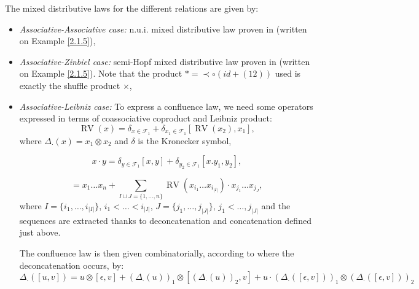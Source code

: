 \documentclass[11pt,leqno]{amsart}
\theoremstyle{definition}
\theoremstyle{plain}
\newcommand{\F}{ \mathcal{F} }
\begin{document}
The mixed distributive laws for the different relations are given by:
\begin{itemize}
\item \emph{Associative-Associative case:} n.u.i. mixed distributive law  proven in \cite{nui} (written on Example \ref{2.1.5}),
\item \emph{Associative-Zinbiel case:} semi-Hopf mixed distributive law proven in\cite{AsZinb} (written on Example \ref{2.1.5}). Note that the product $\ast=\prec \circ (id+(12))$ used is exactly the shuffle product $\times$,

\item \emph{Associative-Leibniz case:} To express a confluence law, we need some operators expressed in terms of coassociative coproduct and Leibniz product:
\begin{equation*}
\operatorname{RV}(x) = \delta_{x \in \F_1} + \delta_{x_1 \in \F_1} [\operatorname{RV}(x_2), x_1],
\end{equation*}
where $\Delta_{\cdot}(x)=x_1 \otimes x_2$ and $\delta$ is the Kronecker symbol,

\begin{equation*}
x \cdot y = \delta_{y \in \F_1} [x,y] + \delta_{y_2 \in \F_1} [x.y_1, y_2],
\end{equation*}

\begin{equation*}
[\epsilon,x_1 \ldots x_n] = x_1 \ldots x_n + \sum_{I \sqcup J=\{1, \ldots, n\}} \operatorname{RV}(x_{i_1} \ldots x_{i_{|I|}}) \cdot x_{j_1} \ldots x_{j_{J}},
\end{equation*}
where $I=\{i_1, \ldots, i_{|I|}\}$, $i_1 < \ldots <i_{|I|}$, $J=\{j_1, \ldots, j_{|J|}\}$, $j_1 < \ldots, j_{|J|}$ and the sequences are extracted thanks to deconcatenation and concatenation defined just above.

The confluence law is then given combinatorially, according to where the deconcatenation occurs, by:
\begin{equation*}
\Delta_{\cdot}([u,v]) = u \otimes [\epsilon,v] + \left(\Delta_{\cdot}(u)\right)_1  \otimes \left[ \left(\Delta_{\cdot}(u)\right)_2 , v \right] + u \cdot \left(\Delta_{\cdot}([\epsilon,v])\right)_1   \otimes \left(\Delta_{\cdot}([\epsilon,v])\right)_2
\end{equation*}


\end{itemize}
\end{document}
